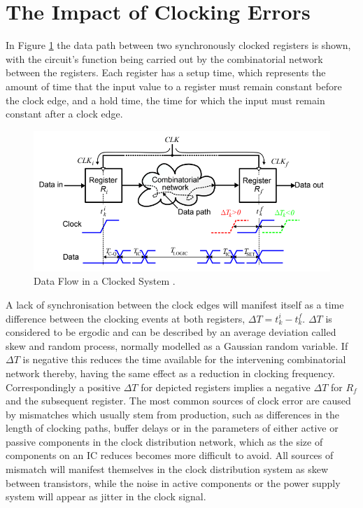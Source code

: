 \section{The Impact of Clocking Errors}
In Figure \ref{fig:eldar_why_precise_clocking} the data path between two synchronously clocked registers is shown, with the circuit's function being carried out by the combinatorial network between the registers.
Each register has a setup time, which represents the amount of time that the input value to a register must remain constant before the clock edge, and a hold time, the time for which the input must remain constant after a clock edge.
\begin{figure}[h]
	\centering
	\includegraphics[scale=0.6]{../eldar_why_precise_clocking}
	\caption{Data Flow in a Clocked System \cite{zianbetov2013phd}.}
	\label{fig:eldar_why_precise_clocking}
\end{figure}

A lack of synchronisation between the clock edges will manifest itself as a time difference between the clocking events at both registers, $\Delta T = t^i_k - t^f_k$. $\Delta T$ is considered to be ergodic and can be described by an average deviation called skew and random process, normally modelled as a Gaussian random variable. If $\Delta T$ is negative this reduces the time available for the intervening combinatorial network thereby, having the same effect as a reduction in clocking frequency. Correspondingly a positive $\Delta T$ for depicted registers implies a negative $\Delta T$ for $R_f$ and the subsequent register. 
The most common sources of clock error are caused by mismatches which usually stem from production, such as differences in the length of clocking paths, buffer delays or in the parameters of either active or passive components in the clock distribution network, which as the size of components on an \ac{IC} reduces becomes more difficult to avoid. All sources of mismatch will manifest themselves in the clock distribution system as skew between transistors, while the noise in active components or the power supply system will appear as jitter in the clock signal.

